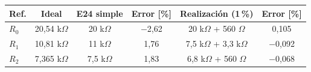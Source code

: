 \begin{tabular}{@{}lccccc@{}}
\toprule
Ref. & Ideal & E24 simple & Error [\%] & Realización (1\,\%) & Error [\%] \\
\midrule
$R_0$ & 20,54 k$\Omega$ & 20 k$\Omega$ & $-$2{,}62 & 20 k$\Omega$ + 560 $\Omega$ & 0{,}105 \\
$R_1$ & 10,81 k$\Omega$ & 11 k$\Omega$ & 1{,}76 & 7,5 k$\Omega$ + 3,3 k$\Omega$ & $-$0{,}092 \\
$R_2$ & 7,365 k$\Omega$ & 7,5 k$\Omega$ & 1{,}83 & 6,8 k$\Omega$ + 560 $\Omega$ & $-$0{,}068 \\
\bottomrule
\end{tabular}